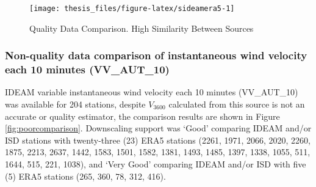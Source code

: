 \documentclass[12pt,oneside]{reedthesis}
\begin{document}
\begin{figure}

{\centering \texttt{[image: thesis\_files/figure-latex/sideamera5-1]} 

}

\caption{Quality Data Comparison. High Similarity Between Sources}\label{fig:sideamera5}
\end{figure}
\hypertarget{non-quality-data-comparison-of-instantaneous-wind-velocity-each-10-minutes-vv_aut_10}{%
\subsubsection{Non-quality data comparison of instantaneous wind velocity each 10 minutes (VV\_AUT\_10)}\label{non-quality-data-comparison-of-instantaneous-wind-velocity-each-10-minutes-vv_aut_10}}

IDEAM variable instantaneous wind velocity each 10 minutes (VV\_AUT\_10) was available for 204 stations, despite \(V_{3600}\) calculated from this source is not an accurate or quality estimator, the comparison results are shown in Figure \ref{fig:poorcomparison}. Downscaling support was `Good' comparing IDEAM and/or ISD stations with twenty-three (23) ERA5 stations (2261, 1971, 2066, 2020, 2260, 1875, 2213, 2637, 1442, 1583, 1501, 1582, 1381, 1493, 1485, 1397, 1338, 1055, 511, 1644, 515, 221, 1038), and `Very Good' comparing IDEAM and/or ISD with five (5) ERA5 stations (265, 360, 78, 312, 416).
\end{document}
